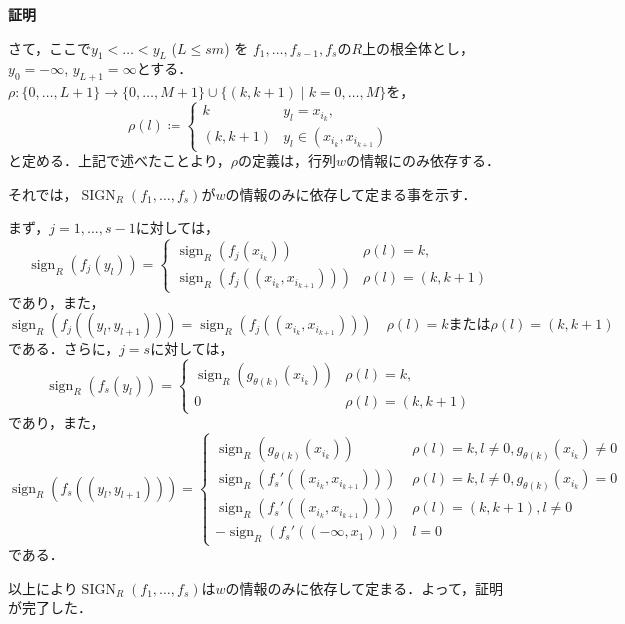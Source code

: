 \documentclass[uplatex, dvipdfmx]{jsarticle}
\makeatletter
\numberwithin{equation}{section}
\renewenvironment{proof}[1][\proofname]{\par
  \pushQED{\qed}%
  \normalfont \topsep6\p@\@plus6\p@\relax
  \trivlist
  \item\relax
  {\bfseries
  #1\@addpunct{.}}\hspace\labelsep\ignorespaces
}{
  \popQED\endtrivlist\@endpefalse
}
\newcommand{\map}[3]{{#1}\colon{#2}\rightarrow{#3}}
\DeclareMathOperator{\sign}{sign}
\DeclareMathOperator{\SIGN}{SIGN}
\theoremstyle{definition}
\renewcommand{\proofname}{\textbf{証明}}
\makeatother
\begin{document}
\begin{proof}
     さて，ここで$y_1 < \dots < y_L$ ($L \leq sm$) を
     $f_1, \dots, f_{s-1}, f_s$の$R$上の根全体とし，$y_0 = -\infty$, $y_{L+1} = \infty$とする．
     $\map{\rho}{\{0, \dots, L+1\}}{\{0, \dots, M+1\} \cup \{(k,k+1) \mid k=0, \dots, M\}}$を，
     \begin{equation}
          \rho(l) \coloneqq \begin{cases} 
               k & y_l = x_{i_k},\\
               (k, k+1) & y_l \in (x_{i_k}, x_{i_{k+1}})
          \end{cases}
     \end{equation}
     と定める．上記で述べたことより，$\rho$の定義は，行列$w$の情報にのみ依存する．

     それでは，$\SIGN_R(f_1, \dots, f_s)$が$w$の情報のみに依存して定まる事を示す．
     
     まず，$j=1, \dots, s-1$に対しては，
     \begin{equation}
          \sign_R(f_j(y_l)) = \begin{cases}
               \sign_R(f_j(x_{i_k})) & \rho(l) = k,\\
               \sign_R(f_j((x_{i_k}, x_{i_{k+1}}))) & \rho(l) = (k, k+1)
          \end{cases}
     \end{equation}
     であり，また，
     \begin{equation}
          \sign_R(f_j((y_l,y_{l+1}))) = \sign_R(f_j((x_{i_k}, x_{i_{k+1}}))) \quad \text{$\rho(l)=k$または$\rho(l)=(k,k+1)$}
     \end{equation}
     である．さらに，$j=s$に対しては，
     \begin{equation}
          \sign_R(f_s(y_l)) = \begin{cases}
               \sign_R(g_{\theta(k)}(x_{i_k})) & \rho(l) = k,\\
               0 & \rho(l) = (k, k+1)
          \end{cases}
     \end{equation}
     であり，また，
     \begin{equation}
          \sign_R(f_s((y_l,y_{l+1}))) = \begin{cases}
               \sign_R(g_{\theta(k)}(x_{i_k})) & \rho(l) = k, l \neq 0, g_{\theta(k)}(x_{i_k})\neq 0\\
               \sign_R(f_s'((x_{i_k},x_{i_{k+1}}))) & \rho(l)=k, l \neq 0, g_{\theta(k)}(x_{i_k}) = 0 \\
               \sign_R(f_s'((x_{i_k}, x_{i_{k+1}}))) & \rho(l) = (k, k+1), l \neq 0\\
               -\sign_R(f_s'((-\infty, x_1))) & l=0
          \end{cases}
     \end{equation}
     である．

     以上により$\SIGN_R(f_1, \dots, f_s)$は$w$の情報のみに依存して定まる．よって，証明が完了した．
\end{proof}
\end{document}
